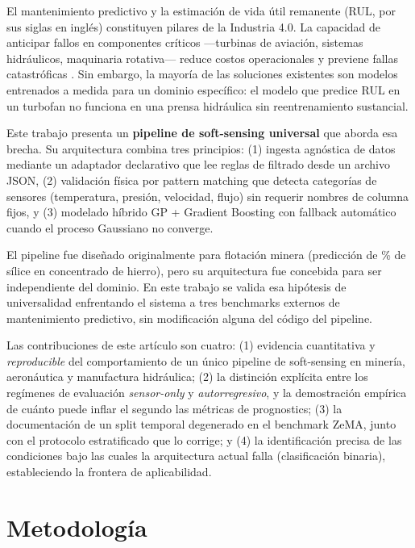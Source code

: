 \documentclass[10pt]{article}
\begin{document}
El mantenimiento predictivo y la estimación de vida útil remanente (RUL, por sus siglas en inglés) constituyen pilares de la Industria 4.0. La capacidad de anticipar fallos en componentes críticos ---turbinas de aviación, sistemas hidráulicos, maquinaria rotativa--- reduce costos operacionales y previene fallas catastróficas \cite{saxena2008}. Sin embargo, la mayoría de las soluciones existentes son modelos entrenados a medida para un dominio específico: el modelo que predice RUL en un turbofan no funciona en una prensa hidráulica sin reentrenamiento sustancial.

Este trabajo presenta un \textbf{pipeline de soft-sensing universal} que aborda esa brecha. Su arquitectura combina tres principios: (1) ingesta agnóstica de datos mediante un adaptador declarativo que lee reglas de filtrado desde un archivo JSON, (2) validación física por pattern matching que detecta categorías de sensores (temperatura, presión, velocidad, flujo) sin requerir nombres de columna fijos, y (3) modelado híbrido GP + Gradient Boosting con fallback automático cuando el proceso Gaussiano no converge.

El pipeline fue diseñado originalmente para flotación minera (predicción de \% de sílice en concentrado de hierro), pero su arquitectura fue concebida para ser independiente del dominio. En este trabajo se valida esa hipótesis de universalidad enfrentando el sistema a tres benchmarks externos de mantenimiento predictivo, sin modificación alguna del código del pipeline.

Las contribuciones de este artículo son cuatro: (1) evidencia cuantitativa y \emph{reproducible} del comportamiento de un único pipeline de soft-sensing en minería, aeronáutica y manufactura hidráulica; (2) la distinción explícita entre los regímenes de evaluación \emph{sensor-only} y \emph{autorregresivo}, y la demostración empírica de cuánto puede inflar el segundo las métricas de prognostics; (3) la documentación de un split temporal degenerado en el benchmark ZeMA, junto con el protocolo estratificado que lo corrige; y (4) la identificación precisa de las condiciones bajo las cuales la arquitectura actual falla (clasificación binaria), estableciendo la frontera de aplicabilidad.

\section{Metodología}
\end{document}
